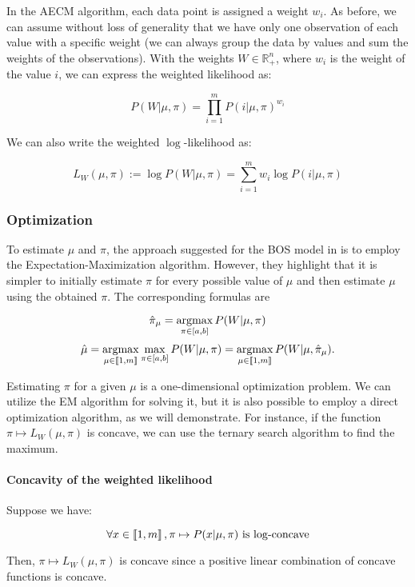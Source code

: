 In the AECM algorithm, each data point is assigned a weight $w_i$. As before, we can assume without loss of generality that we have only one observation of each value with a specific weight (we can always group the data by values and sum the weights of the observations). With the weights $W \in \mathbb{R}_+^n$, where $w_i$ is the weight of the value $i$, we can express the weighted likelihood as:


$$P(W | \mu, \pi) = \prod_{i=1}^m P(i | \mu, \pi)^{w_i}$$

We can also write the weighted $\log$-likelihood as:

$$L_W(\mu, \pi) := \log P(W | \mu, \pi) = \sum_{i=1}^m w_i \log P(i | \mu, \pi)$$


\subsubsection{Optimization}
\label{sec:univariate_generic_estimation}

To estimate $\mu$ and $\pi$, the approach suggested for the BOS model in \cite{biernacki2016model} is to employ the Expectation-Maximization algorithm. However, they highlight that it is simpler to initially estimate $\pi$ for every possible value of $\mu$ and then estimate $\mu$ using the obtained $\pi$. The corresponding formulas are


$$\hat{\pi}_{\mu} = \operatorname*{argmax}_{\pi \in [a, b]} P(W | \mu, \pi)$$
$$\hat{\mu} = \operatorname*{argmax}_{\mu \in \left\llbracket1, m\right\rrbracket} \max_{\pi \in [a, b]} P(W | \mu, \pi) = \operatorname*{argmax}_{\mu \in \left\llbracket1, m\right\rrbracket} P(W | \mu, \hat{\pi}_{\mu}).$$

Estimating $\pi$ for a given $\mu$ is a one-dimensional optimization problem. We can utilize the EM algorithm for solving it, but it is also possible to employ a direct optimization algorithm, as we will demonstrate. For instance, if the function $\pi \mapsto L_W(\mu, \pi)$ is concave, we can use the ternary search algorithm to find the maximum.

\paragraph{Concavity of the weighted likelihood}

Suppose we have:

$$\forall x \in \left\llbracket1, m\right\rrbracket, \pi \mapsto P(x | \mu, \pi) \text{ is $\log$-concave}$$

Then, $\pi \mapsto L_W(\mu, \pi)$ is  concave since a positive linear combination of concave functions is concave.

